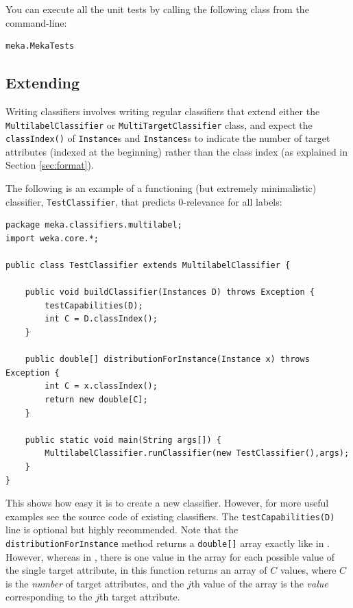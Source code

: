 \documentclass[11pt]{article}
\newcommand{\MEKA}{Meka}
\newcommand{\WEKA}{Weka}
\begin{document}
\noindent You can execute all the unit tests by calling the following class from the command-line:
\begin{lstlisting}
meka.MekaTests
\end{lstlisting}

\subsection{\label{sec:extending}Extending \framework{\MEKA}}%

Writing \framework{\MEKA} classifiers involves writing regular \framework{\WEKA} classifiers that extend either the \texttt{MultilabelClassifier} or \texttt{MultiTargetClassifier} class, and expect the \texttt{classIndex()} of \texttt{Instance}s and \texttt{Instances}s to indicate the number of target attributes (indexed at the beginning) rather than the class index (as explained in Section \ref{sec:format}). 

The following is an example of a functioning (but extremely minimalistic) classifier, \texttt{TestClassifier}, that predicts $0$-relevance for all labels:

{\small
\lstset{basicstyle=\small\ttfamily,breaklines=true,language=java,frame=L,xleftmargin=\parindent}
\begin{lstlisting}
package meka.classifiers.multilabel;
import weka.core.*;

public class TestClassifier extends MultilabelClassifier {
	
    public void buildClassifier(Instances D) throws Exception {
        testCapabilities(D);
        int C = D.classIndex();
    }
    
    public double[] distributionForInstance(Instance x) throws Exception {
        int C = x.classIndex();
       	return new double[C];
    }
    
    public static void main(String args[]) {
        MultilabelClassifier.runClassifier(new TestClassifier(),args);
    }
}
\end{lstlisting}
}

This shows how easy it is to create a new classifier. However, for more useful examples see the source code of existing \framework{\MEKA} classifiers. The \texttt{testCapabilities(D)} line is optional but highly recommended. Note that the \texttt{distributionForInstance} method returns a \texttt{double[]} array exactly like in \framework{\WEKA}. However, whereas in \framework{\WEKA}, there is one value in the array for each possible value of the single target attribute, in \framework{\MEKA} this function returns an array of $C$ values, where $C$ is the \emph{number} of target attributes, and the $j$th value of the array is the \emph{value} corresponding to the $j$th target attribute.
\end{document}
